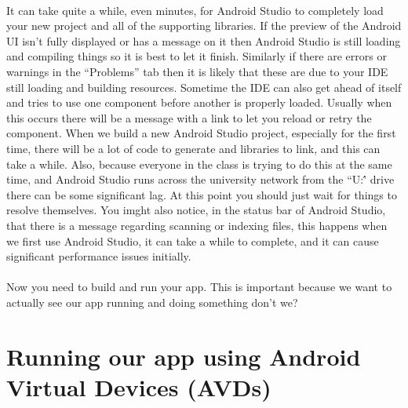 \paragraph{} It can take quite a while, even minutes, for Android Studio to completely load your new project and all of the supporting libraries. If the preview of the Android UI isn't fully displayed or has a message on it then Android Studio is still loading and compiling things so it is best to let it finish. Similarly if there are errors or warnings in the ``Problems'' tab then it is likely that these are due to your IDE still loading and building resources. Sometime the IDE can also get ahead of itself and tries to use one component before another is properly loaded. Usually when this occurs there will be a message with a link to let you reload or retry the component. When we build a new Android Studio project, especially for the first time, there will be a lot of code to generate and libraries to link, and this can take a while. Also, because everyone in the class is trying to do this at the same time, and Android Studio runs across the university network from the ``U:\'' drive there can be some significant lag. At this point you should just wait for things to resolve themselves. You imght also notice, in the status bar of Android Studio, that there is a message regarding scanning or indexing files, this happens when we first use Android Studio, it can take a while to complete, and it can cause significant performance issues initially.

\paragraph{} Now you need to build and run your app. This is important because we want to actually see our app running and doing something don't we?

\section{Running our app using Android Virtual Devices (AVDs)}
\label{avd}

